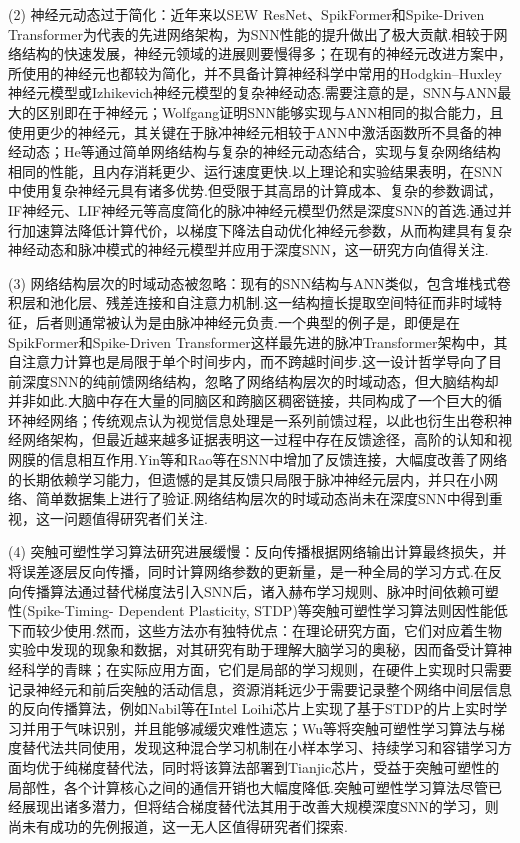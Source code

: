 \documentclass{SCIS2020cn}
\begin{document}
(2) 神经元动态过于简化：近年来以SEW ResNet\cite{SEWResNet}、SpikFormer\cite{zhou2023spikformer}和Spike-Driven Transformer\cite{NEURIPS2023_ca0f5358}为代表的先进网络架构，为SNN性能的提升做出了极大贡献.相较于网络结构的快速发展，神经元领域的进展则要慢得多；在现有的神经元改进方案\cite{fang2021incorporating, ijcai2022p343, fang2023parallel, huang2024clif}中，所使用的神经元也都较为简化，并不具备计算神经科学中常用的Hodgkin–Huxley神经元模型或Izhikevich神经元模型的复杂神经动态.需要注意的是，SNN与ANN最大的区别即在于神经元；Wolfgang证明SNN能够实现与ANN相同的拟合能力，且使用更少的神经元\cite{maass1997networks}，其关键在于脉冲神经元相较于ANN中激活函数所不具备的神经动态；He等\cite{he2024network}通过简单网络结构与复杂的神经元动态结合，实现与复杂网络结构相同的性能，且内存消耗更少、运行速度更快.以上理论和实验结果表明，在SNN中使用复杂神经元具有诸多优势.但受限于其高昂的计算成本、复杂的参数调试，IF神经元、LIF神经元等高度简化的脉冲神经元模型仍然是深度SNN的首选.通过并行加速算法降低计算代价，以梯度下降法自动优化神经元参数，从而构建具有复杂神经动态和脉冲模式的神经元模型并应用于深度SNN，这一研究方向值得关注.

(3) 网络结构层次的时域动态被忽略：现有的SNN结构与ANN类似，包含堆栈式卷积层和池化层、残差连接和自注意力机制.这一结构擅长提取空间特征而非时域特征，后者则通常被认为是由脉冲神经元负责.一个典型的例子是，即便是在SpikFormer\cite{zhou2023spikformer}和Spike-Driven Transformer\cite{NEURIPS2023_ca0f5358}这样最先进的脉冲Transformer架构中，其自注意力计算也是局限于单个时间步内，而不跨越时间步.这一设计哲学导向了目前深度SNN的纯前馈网络结构，忽略了网络结构层次的时域动态，但大脑结构却并非如此.大脑中存在大量的同脑区和跨脑区稠密链接，共同构成了一个巨大的循环神经网络；传统观点认为视觉信息处理是一系列前馈过程，以此也衍生出卷积神经网络架构，但最近越来越多证据表明这一过程中存在反馈途径，高阶的认知和视网膜的信息相互作用\cite{gilbert2013top}.Yin等\cite{yin2021accurate}和Rao等\cite{rao2022long}在SNN中增加了反馈连接，大幅度改善了网络的长期依赖学习能力，但遗憾的是其反馈只局限于脉冲神经元层内，并只在小网络、简单数据集上进行了验证.网络结构层次的时域动态尚未在深度SNN中得到重视，这一问题值得研究者们关注.

(4) 突触可塑性学习算法研究进展缓慢：反向传播根据网络输出计算最终损失，并将误差逐层反向传播，同时计算网络参数的更新量，是一种全局的学习方式.在反向传播算法通过替代梯度法引入SNN后，诸入赫布学习规则\cite{hebb1949the}、脉冲时间依赖可塑性(Spike-Timing-
Dependent Plasticity, STDP)\cite{bi1998synaptic}等突触可塑性学习算法则因性能低下而较少使用.然而，这些方法亦有独特优点：在理论研究方面，它们对应着生物实验中发现的现象和数据，对其研究有助于理解大脑学习的奥秘，因而备受计算神经科学的青睐；在实际应用方面，它们是局部的学习规则，在硬件上实现时只需要记录神经元和前后突触的活动信息，资源消耗远少于需要记录整个网络中间层信息的反向传播算法，例如Nabil等\cite{imam2020rapid}在Intel Loihi芯片\cite{loihi}上实现了基于STDP的片上实时学习并用于气味识别，并且能够减缓灾难性遗忘；Wu等\cite{wu2022brain}将突触可塑性学习算法与梯度替代法共同使用，发现这种混合学习机制在小样本学习、持续学习和容错学习方面均优于纯梯度替代法，同时将该算法部署到Tianjic芯片\cite{pei2019towards}，受益于突触可塑性的局部性，各个计算核心之间的通信开销也大幅度降低.突触可塑性学习算法尽管已经展现出诸多潜力，但将结合梯度替代法其用于改善大规模深度SNN的学习，则尚未有成功的先例报道，这一无人区值得研究者们探索.
\end{document}
